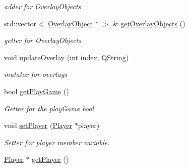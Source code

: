 \begin{DoxyCompactItemize}
\begin{DoxyCompactList}\small\item\em adder for Overlay\+Objects \end{DoxyCompactList}\item 
\hypertarget{class_table_scene_ae92209b5c74ae7f4ba6d3872aa2578db}{std\+::vector$<$ \hyperlink{class_overlay_object}{Overlay\+Object} $\ast$ $>$ \& \hyperlink{class_table_scene_ae92209b5c74ae7f4ba6d3872aa2578db}{get\+Overlay\+Objects} ()}\label{class_table_scene_ae92209b5c74ae7f4ba6d3872aa2578db}

\begin{DoxyCompactList}\small\item\em getter for Overlay\+Objects \end{DoxyCompactList}\item 
\hypertarget{class_table_scene_adc85426c14e38ddc222ff62a7f25743f}{void \hyperlink{class_table_scene_adc85426c14e38ddc222ff62a7f25743f}{update\+Overlay} (int index, Q\+String)}\label{class_table_scene_adc85426c14e38ddc222ff62a7f25743f}

\begin{DoxyCompactList}\small\item\em mutator for overlays \end{DoxyCompactList}\item 
\hypertarget{class_table_scene_abda1811e505edc8058155c01795e6740}{bool \hyperlink{class_table_scene_abda1811e505edc8058155c01795e6740}{get\+Play\+Game} ()}\label{class_table_scene_abda1811e505edc8058155c01795e6740}

\begin{DoxyCompactList}\small\item\em Getter for the play\+Game bool. \end{DoxyCompactList}\item 
\hypertarget{class_table_scene_a4fb355f5bd6ea8973e82404bf8cc1bc9}{void \hyperlink{class_table_scene_a4fb355f5bd6ea8973e82404bf8cc1bc9}{set\+Player} (\hyperlink{class_player}{Player} $\ast$player)}\label{class_table_scene_a4fb355f5bd6ea8973e82404bf8cc1bc9}

\begin{DoxyCompactList}\small\item\em Setter for player member variable. \end{DoxyCompactList}\item 
\hypertarget{class_table_scene_a33af3ee1dc5da4402df15578a59cc33a}{\hyperlink{class_player}{Player} $\ast$ \hyperlink{class_table_scene_a33af3ee1dc5da4402df15578a59cc33a}{get\+Player} ()}\label{class_table_scene_a33af3ee1dc5da4402df15578a59cc33a}


\end{DoxyCompactItemize}
